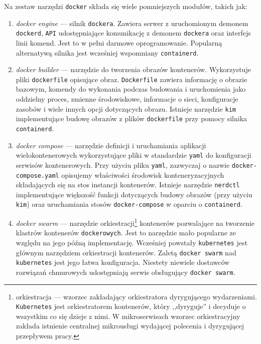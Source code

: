 \documentclass[12pt,twoside]{article}
\begin{document}
Na zestaw narzędzi \texttt{docker} składa się wiele pomniejszych modułów, takich jak:
\begin{enumerate}[label=\arabic*), leftmargin=1.25cm]
\item \textit{docker engine} — silnik \texttt{dockera}. Zawiera serwer z uruchomionym demonem \texttt{dockerd}, \texttt{API} udostępniające komunikację z demonem \texttt{dockera} oraz interfejs linii komend. Jest to w pełni darmowe oprogramowanie. Popularną alternatywą silnika jest wcześniej wspomniany \texttt{containerd}.
\item \textit{docker builder} — narzędzie do tworzenia obrazów kontenerów. Wykorzystuje pliki \texttt{dockerfile} opisujące obraz. \texttt{Dockerfile} zawiera informację o obrazie bazowym, komendy do wykonania podczas budowania i uruchomienia jako oddzielny proces, zmienne środowiskowe, informacje o sieci, konfiguracje zasobów i wiele innych opcji dotyczących obrazu. Istnieje narzędzie \texttt{kim} implementujące budowę obrazów z plików \texttt{dockerfile} przy pomocy silnika \texttt{containerd}.
\item \textit{docker compose} — narzędzie definicji i uruchamiania aplikacji wielokontenerowych wykorzystujące pliki w standardzie \texttt{yaml} do konfiguracji serwisów kontenerowych. Przy użyciu pliku \texttt{yaml}, zazwyczaj o nazwie \texttt{docker-compose.yaml} opisujemy właściwości środowisk konteneryzacyjnych składających się na stos instancji kontenerów. Istnieje narzędzie \texttt{nerdctl} implementujące większość funkcji dotyczących budowy obrazów (przy użyciu \texttt{kim}) oraz uruchamiania stosów \texttt{docker-compose} w oparciu o \texttt{containerd}.
\item \textit{docker swarm} — narzędzie orkiestracji\footnote{orkiestracja — wzorzec zakładający orkiestratora dyrygującego wydarzeniami. \texttt{Kubernetes} jest orkiestratorem kontenerów, który ,,dyryguje'' i decyduje o wszystkim co się dzieje z nimi\cite{kubernetesInAction}. W mikroserwisach wzorzec orkiestracyjny zakłada istnienie centralnej mikrousługi wydającej polecenia i dyrygującej przepływem pracy\cite{eventDrivenMicroservices}.} kontenerów pozwalające na tworzenie klastrów kontenerów \texttt{dockerowych}. Jest to narzędzie mało popularne ze względu na jego późną implementację. Wcześniej powstały \texttt{kubernetes} jest głównym narzędziem orkiestracji kontenerów. Zaletą \texttt{docker swarm} nad \texttt{kubernetes} jest jego łatwa konfiguracja. Niestety niewiele dostawców rozwiązań chmurowych udostępniają serwis obsługujący \texttt{docker swarm}.

\end{enumerate}
\end{document}
